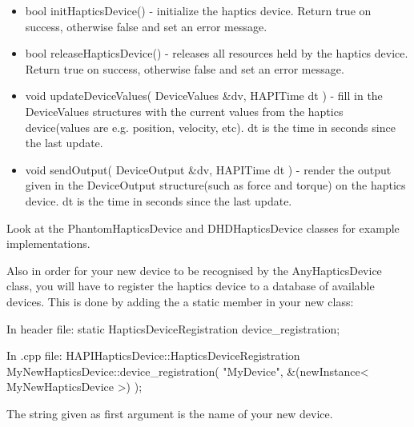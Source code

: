 \begin{itemize}
\item bool initHapticsDevice() - initialize the haptics device. Return
  true on success, otherwise false and set an error message. 
\item bool releaseHapticsDevice() - releases all resources held by the
  haptics device. Return true on success, otherwise false and set an
  error message. 
\item void updateDeviceValues( DeviceValues &dv, HAPITime dt ) - fill
  in the DeviceValues structures with the current values from the
  haptics device(values are e.g. position, velocity, etc). dt is the
  time in seconds since the last update.
\item void sendOutput( DeviceOutput &dv, HAPITime dt ) - render the
  output given in the DeviceOutput structure(such as force and torque)
  on the haptics device. dt is the time in seconds since the last update.
\end{itemize}

Look at the PhantomHapticsDevice and DHDHapticsDevice classes for
example implementations. 

Also in order for your new device to be recognised by the
AnyHapticsDevice class, you will have to register the haptics device
to a database of available devices. This is done by adding the a
static member in your new class:

In header file:
static HapticsDeviceRegistration device_registration;

In .cpp file:
HAPIHapticsDevice::HapticsDeviceRegistration 
MyNewHapticsDevice::device_registration(
                            "MyDevice",
                            &(newInstance< MyNewHapticsDevice >)
                            );

The string given as first argument is the name of your new device.

